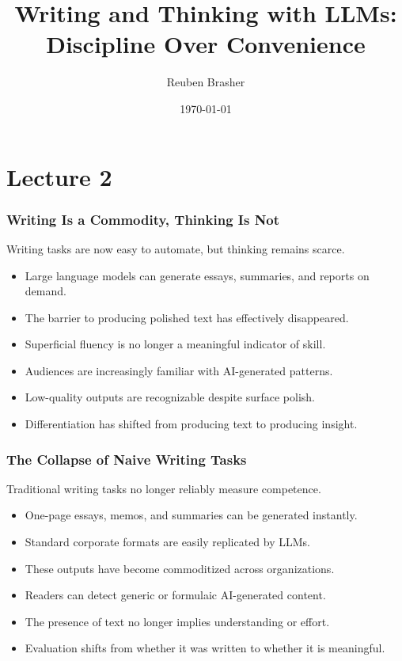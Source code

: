 \documentclass{beamer}
\title{Writing and Thinking with LLMs: Discipline Over Convenience}
\author{Reuben Brasher}
\date{\today}
\begin{document}
\frame{\titlepage}

\section[Outline]{}
\frame{\tableofcontents}

\section{Lecture 2}

\frame
{
   \frametitle{Writing Is a Commodity, Thinking Is Not}

    Writing tasks are now easy to automate, but thinking remains scarce.

    \begin{itemize}
        \item Large language models can generate essays, summaries, and reports on demand.
        \item The barrier to producing polished text has effectively disappeared.
        \item Superficial fluency is no longer a meaningful indicator of skill.
        \item Audiences are increasingly familiar with AI-generated patterns.
        \item Low-quality outputs are recognizable despite surface polish.
        \item Differentiation has shifted from producing text to producing insight.
    \end{itemize}
}

\frame
{
   \frametitle{The Collapse of Naive Writing Tasks}

    Traditional writing tasks no longer reliably measure competence.

    \begin{itemize}
        \item One-page essays, memos, and summaries can be generated instantly.
        \item Standard corporate formats are easily replicated by LLMs.
        \item These outputs have become commoditized across organizations.
        \item Readers can detect generic or formulaic AI-generated content.
        \item The presence of text no longer implies understanding or effort.
        \item Evaluation shifts from whether it was written to whether it is meaningful.
    \end{itemize}
}
\end{document}
